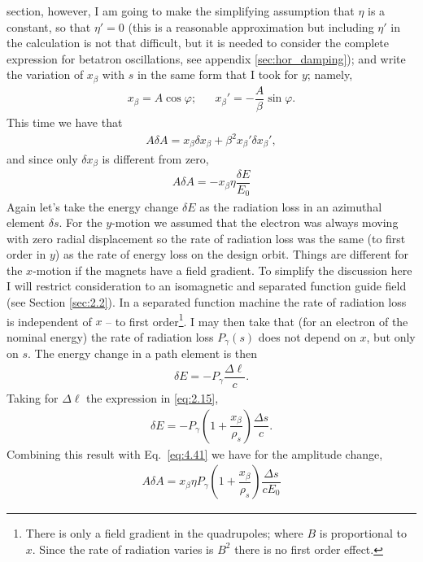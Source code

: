 section, however, I am going to make the simplifying assumption that $\eta$ is a constant, so that $\eta' = 0$ (this is a reasonable approximation but including $\eta'$ in the calculation is not that difficult, but it is needed to consider the complete expression for betatron oscillations, see appendix \ref{sec:hor_damping}); and write the variation of $x_\beta$ with $s$ in the same form that I took for $y$; namely,
\begin{align}
	x_\beta = A \cos \varphi; && x_\beta' = - \dfrac{A}{\beta} \sin \varphi.
\end{align}
This time we have that
\begin{align}
	A \delta A = x_\beta \delta x_\beta + \beta^2 x_\beta' \delta x_\beta',
\end{align}
and since only $\delta x_\beta$ is different from zero,
\begin{align} \label{eq:4.41}
	A \delta A = - x_\beta \eta \dfrac{\delta E}{E_0}
\end{align}
Again let's take the energy change $\delta E$ as the radiation loss in an azimuthal element $\delta s$. For the $y$-motion we assumed that the electron was always moving with zero radial displacement so the rate of radiation loss was the same (to first order in $y$) as the rate of energy loss on the design orbit. Things are different for the $x$-motion if the magnets have a field gradient. To simplify the discussion here I will restrict consideration to an isomagnetic
 and separated function guide field (see Section \ref{sec:2.2}). In a separated function machine the rate of radiation loss is independent of $x$ -- to first order\footnote{There is only a field gradient in the quadrupoles; where $B$ is proportional to $x$. Since the rate of radiation varies is $B^2$ there is no first order effect.}. I may then take that (for an electron of the nominal energy) the rate of radiation loss $P_\gamma(s)$ does not depend on $x$, but only on $s$.
The energy change in a path element is then
\begin{align}
	\delta E = - P_\gamma \dfrac{\Delta \ell}{c}.
\end{align}
Taking for $\Delta \ell$ the expression in \eqref{eq:2.15},
\begin{align}
	\delta E = - P_\gamma \left( 1 + \dfrac{x_\beta}{\rho_s} \right) \dfrac{\Delta s}{c} .
\end{align}
Combining this result with Eq.~\eqref{eq:4.41} we have for the amplitude change,
\begin{align}
	A \delta A = x_\beta \eta P_\gamma \left( 1 + \dfrac{x_\beta}{\rho_s} \right) \dfrac{\Delta s}{cE_0}
\end{align}
